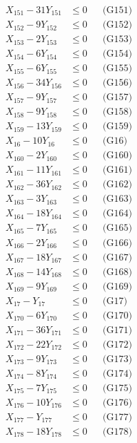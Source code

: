\documentclass[a4paper,10pt]{article}
\begin{document}
{\begin{align}
X_{151} - 31Y_{151} &\leq 0 && \text{(G151)} \\
\allowbreak
X_{152} - 9Y_{152} &\leq 0 && \text{(G152)} \\
X_{153} - 2Y_{153} &\leq 0 && \text{(G153)} \\
X_{154} - 6Y_{154} &\leq 0 && \text{(G154)} \\
X_{155} - 6Y_{155} &\leq 0 && \text{(G155)} \\
X_{156} - 34Y_{156} &\leq 0 && \text{(G156)} \\
X_{157} - 9Y_{157} &\leq 0 && \text{(G157)} \\
X_{158} - 9Y_{158} &\leq 0 && \text{(G158)} \\
X_{159} - 13Y_{159} &\leq 0 && \text{(G159)} \\
X_{16} - 10Y_{16} &\leq 0 && \text{(G16)} \\
X_{160} - 2Y_{160} &\leq 0 && \text{(G160)} \\
X_{161} - 11Y_{161} &\leq 0 && \text{(G161)} \\
X_{162} - 36Y_{162} &\leq 0 && \text{(G162)} \\
X_{163} - 3Y_{163} &\leq 0 && \text{(G163)} \\
X_{164} - 18Y_{164} &\leq 0 && \text{(G164)} \\
X_{165} - 7Y_{165} &\leq 0 && \text{(G165)} \\
X_{166} - 2Y_{166} &\leq 0 && \text{(G166)} \\
X_{167} - 18Y_{167} &\leq 0 && \text{(G167)} \\
X_{168} - 14Y_{168} &\leq 0 && \text{(G168)} \\
X_{169} - 9Y_{169} &\leq 0 && \text{(G169)} \\
X_{17} - Y_{17} &\leq 0 && \text{(G17)} \\
\allowbreak
X_{170} - 6Y_{170} &\leq 0 && \text{(G170)} \\
X_{171} - 36Y_{171} &\leq 0 && \text{(G171)} \\
X_{172} - 22Y_{172} &\leq 0 && \text{(G172)} \\
X_{173} - 9Y_{173} &\leq 0 && \text{(G173)} \\
X_{174} - 8Y_{174} &\leq 0 && \text{(G174)} \\
X_{175} - 7Y_{175} &\leq 0 && \text{(G175)} \\
X_{176} - 10Y_{176} &\leq 0 && \text{(G176)} \\
X_{177} - Y_{177} &\leq 0 && \text{(G177)} \\
X_{178} - 18Y_{178} &\leq 0 && \text{(G178)} \\

\end{align}}
\end{document}
